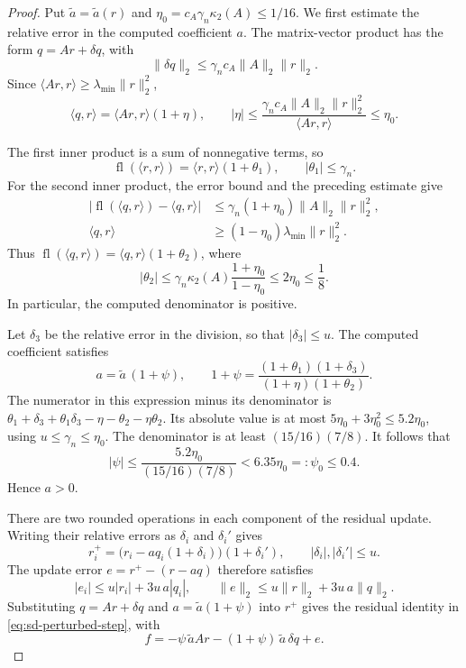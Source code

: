 \documentclass[11pt]{article}
\theoremstyle{definition}
\newcommand{\fl}{\operatorname{fl}}
\begin{document}
\begin{proof}
Put $\tilde a=\tilde a(r)$ and
$\eta_0=c_A\gamma_n\kappa_2(A)\le1/16$.
We first estimate the relative error in the computed coefficient $a$.
The matrix-vector product has the form $q=Ar+\delta q$, with
\[
 \|\delta q\|_2\le\gamma_n c_A\|A\|_2\|r\|_2.
\]
Since $\langle Ar,r\rangle\ge\lambda_{\min}\|r\|_2^2$,
\[
 \langle q,r\rangle=\langle Ar,r\rangle(1+\eta),
 \qquad
 |\eta|\le
 \frac{\gamma_n c_A\|A\|_2\|r\|_2^2}{\langle Ar,r\rangle}
 \le\eta_0.
\]

The first inner product is a sum of nonnegative terms, so
\[
 \fl(\langle r,r\rangle)=\langle r,r\rangle(1+\theta_1),
 \qquad |\theta_1|\le\gamma_n.
\]
For the second inner product, the error bound and the preceding estimate
give
\[
\begin{aligned}
 |\fl(\langle q,r\rangle)-\langle q,r\rangle|
   &\le\gamma_n(1+\eta_0)\|A\|_2\|r\|_2^2,\\
 \langle q,r\rangle
   &\ge(1-\eta_0)\lambda_{\min}\|r\|_2^2.
\end{aligned}
\]
Thus $\fl(\langle q,r\rangle)=\langle q,r\rangle(1+\theta_2)$, where
\[
 |\theta_2|
 \le\gamma_n\kappa_2(A)\frac{1+\eta_0}{1-\eta_0}
 \le2\eta_0\le\frac18.
\]
In particular, the computed denominator is positive.

Let $\delta_3$ be the relative error in the division, so that
$|\delta_3|\le u$. The computed coefficient satisfies
\[
 a=\tilde a\,(1+\psi),
 \qquad
 1+\psi=\frac{(1+\theta_1)(1+\delta_3)}{(1+\eta)(1+\theta_2)} .
\]
The numerator in this expression minus its denominator is
$\theta_1+\delta_3+\theta_1\delta_3-\eta-\theta_2-\eta\theta_2$.
Its absolute value is at most $5\eta_0+3\eta_0^2\le5.2\eta_0$,
using $u\le\gamma_n\le\eta_0$.
The denominator is at least $(15/16)(7/8)$. It follows that
\[
 |\psi|\le
 \frac{5.2\eta_0}{(15/16)(7/8)}
 <6.35\eta_0=:\psi_0\le0.4.
\]
Hence $a>0$.

There are two rounded operations in each component of the residual update.
Writing their relative errors as $\delta_i$ and $\delta_i'$ gives
\[
 r_i^+=\bigl(r_i-aq_i(1+\delta_i)\bigr)(1+\delta_i'),
 \qquad |\delta_i|,|\delta_i'|\le u.
\]
The update error $e=r^+-(r-aq)$ therefore satisfies
\[
 |e_i|\le u|r_i|+3u\,a|q_i|,
 \qquad
 \|e\|_2\le u\|r\|_2+3u\,a\|q\|_2.
\]
Substituting $q=Ar+\delta q$ and $a=\tilde a(1+\psi)$ into $r^+$
gives the residual identity in \eqref{eq:sd-perturbed-step}, with
\[
 f=-\psi\,\tilde aAr-(1+\psi)\,\tilde a\,\delta q+e .
\]


\end{proof}
\end{document}
